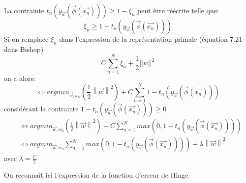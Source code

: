 La contrainte $t_n\left(y_{\overrightarrow{w}}(\overrightarrow{\phi}(\overrightarrow{x_n}))\right) \geqslant 1 - \xi_n$ peut être réécrite telle que:
$$
\xi_n \geqslant 1 - t_n\left(y_{\overrightarrow{w}}(\overrightarrow{\phi}(\overrightarrow{x_n}))\right)
$$
Si on remplace $\xi_n$ dans l'expression de la représentation primale (équation 7.21 dans Bishop)
\begin{equation}
C \sum_{n=1}^N \xi_n + \frac{1}{2} ||w||^2
\end{equation}
on a alors:
\begin{equation}
	\iff argmin_{\overrightarrow{w}, w_0} \left(\frac{1}{2} \left\lVert\overrightarrow{w}\right\rVert^2 \right) + C \sum_{n=1}^N 1 - t_n\left(y_{\overrightarrow{w}}(\overrightarrow{\phi}(\overrightarrow{x_n}))\right)
\end{equation}
considérant la contrainte $1 - t_n\left(y_{\overrightarrow{w}}(\overrightarrow{\phi}(\overrightarrow{x_n}))\right) \geqslant 0$
\begin{equation}
\begin{split}
	&\iff argmin_{\overrightarrow{w}, w_0} \left(\frac{1}{2} \left\lVert\overrightarrow{w}\right\rVert^2 \right) + C \sum_{n=1}^N max\left(0, 1 - t_n\left(y_{\overrightarrow{w}}(\overrightarrow{\phi}(\overrightarrow{x_n}))\right)\right) \\
	&\iff argmin_{\overrightarrow{w}, w_0} \sum_{n=1}^N max\left(0, 1 - t_n\left(y_{\overrightarrow{w}}(\overrightarrow{\phi}(\overrightarrow{x_n}))\right)\right) + \lambda  \left\lVert\overrightarrow{w}\right\rVert^2
\end{split}
\end{equation}
avec $\lambda = \frac{C}{2}$

On reconnaît ici l'expression de la fonction d'erreur de Hinge.


